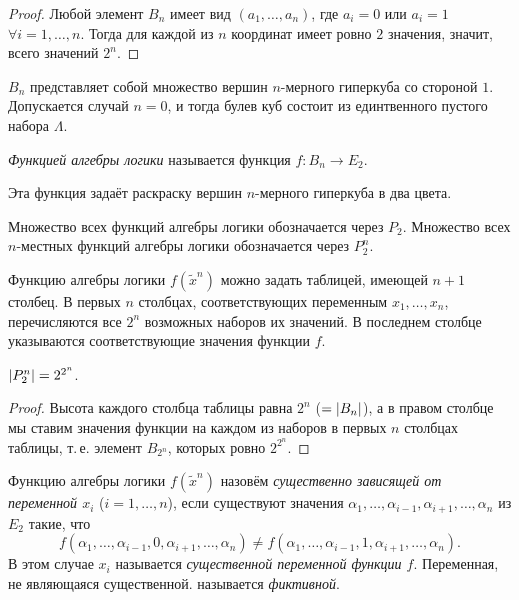 \begin{proof}
    Любой элемент $B_n$ имеет вид $(a_1, \ldots, a_n)$, где $a_i = 0$ или $a_i = 1$ $\forall i = 1, \ldots, n$. Тогда для каждой из $n$ координат имеет ровно $2$ значения, значит, всего значений $2^n$.
\end{proof}

\begin{remark}
    $B_n$ представляет собой множество вершин $n$-мерного гиперкуба со стороной $1$. Допускается случай $n = 0$, и тогда булев куб состоит из единтвенного пустого набора $\Lambda$.
\end{remark}

\begin{definition}
    \textit{Функцией алгебры логики} называется функция $f: B_n \to E_2$.
\end{definition}

\begin{remark}
    Эта функция задаёт раскраску вершин $n$-мерного гиперкуба в два цвета.
\end{remark}

Множество всех функций алгебры логики обозначается через $P_2$. Множество всех $n$-местных функций алгебры логики обозначается через $P_2^n$.

Функцию алгебры логики $f(\widetilde{x}^n)$ можно задать таблицей, имеющей $n + 1$ столбец. В первых $n$ столбцах, соответствующих переменным $x_1, \ldots, x_n$, перечисляются все $2^n$ возможных наборов их значений. В последнем столбце указываются соответствующие значения функции $f$.

\begin{proposal}
    $\left\lvert P_2^n\right\rvert = 2^{2^n}$.
\end{proposal}

\begin{proof}
    Высота каждого столбца таблицы равна $2^n$ ($ = \left\lvert B_n\right\rvert$), а в правом столбце мы ставим значения функции на каждом из наборов в первых $n$ столбцах таблицы, т.\,е. элемент $B_{2^n}$, которых ровно $2^{2^n}$.
\end{proof}

\begin{definition}
    Функцию алгебры логики $f(\widetilde{x}^n)$ назовём \textit{существенно зависящей от переменной $x_i$} ($i = 1, \ldots, n$), если существуют значения $\alpha_1, \ldots, \alpha_{i - 1}, \alpha_{i + 1}, \ldots, \alpha_n$ из $E_2$ такие, что \[f(\alpha_1, \ldots, \alpha_{i - 1}, 0, \alpha_{i + 1}, \ldots, \alpha_n) \ne f(\alpha_1, \ldots, \alpha_{i - 1}, 1, \alpha_{i + 1}, \ldots, \alpha_n).\]
    В этом случае $x_i$ называется \textit{существенной переменной функции $f$}. Переменная, не являющаяся существенной. называется \textit{фиктивной}.
\end{definition}

